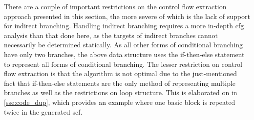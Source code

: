 There are a couple of important restrictions on the control flow extraction approach
presented in this section,
the more severe of which is the lack of support for indirect branching.
Handling indirect branching requires a more in-depth \ac{cfg} analysis
than that done here,
as the targets of indirect branches cannot necessarily be determined statically.
As all other forms of conditional branching have only two branches,
the above data structure uses the if-then-else statement to represent all forms of
conditional branching.
The lesser restriction on control flow extraction is that the algorithm is not optimal
due to the just-mentioned fact that if-then-else statements
are the only method of representing multiple branches
as well as the restrictions on loop structure.
This is elaborated on in \cref{sse:code_dup},
which provides an example where one basic block is repeated twice
in the generated \ac{scf}.

